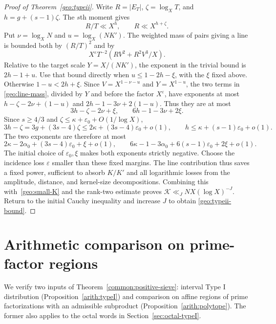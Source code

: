 \documentclass[11pt,a4paper]{article}
\theoremstyle{paperplain}
\numberwithin{equation}{section}
\begin{document}
\begin{proof}[Proof of Theorem~\ref{geo:typeii}]
Write $R=|E_T|$, $\zeta=\log_XT$, and $h=g+(s-1)\zeta$.
The $s$th moment gives
\[
 R/T\ll X^h,\qquad R\ll X^{h+\zeta}.
\]
Put $\nu=\log_XN$ and $u=\log_X(NK')$.
The weighted mass of pairs giving a line is bounded both by $(R/T)^2$ and by
\begin{equation}\label{geo:line-mass}
 X^\varepsilon T^{-2}\left(RV^2+R^2V^3/X\right).
\end{equation}
Relative to the target scale $Y=X/(NK')$, the exponent in the trivial bound is
$2h-1+u$.
Use that bound directly when $u\le1-2h-\xi$, with the $\xi$ fixed above.
Otherwise $1-u<2h+\xi$. Since $V=X^{1-\nu-u}$ and $Y=X^{1-u}$,
the two terms in \eqref{geo:line-mass}, divided by $Y$ and before the
factor $X^\varepsilon$, have exponents at most
$h-\zeta-2\nu+(1-u)$ and $2h-1-3\nu+2(1-u)$. Thus they are at most
\[
 3h-\zeta-2\nu+\xi,\qquad 6h-1-3\nu+2\xi.
\]
Since $s\ge4/3$ and
$\zeta\le\kappa+\varepsilon_0+O(1/\log X)$,
\[
 3h-\zeta=3g+(3s-4)\zeta
 \le2\kappa+(3s-4)\varepsilon_0+o(1),\qquad
 h\le\kappa+(s-1)\varepsilon_0+o(1).
\]
The two exponents are therefore at most
\begin{equation}\label{geo:line-powers}
 2\kappa-2\alpha_0+(3s-4)\varepsilon_0+\xi+o(1),\qquad
 6\kappa-1-3\alpha_0+6(s-1)\varepsilon_0+2\xi+o(1).
\end{equation}
The initial choice of $\varepsilon_0,\xi$ makes both exponents strictly
negative. Choose the incidence loss $\varepsilon$ smaller than these
fixed margins.
The line contribution thus saves a fixed power, sufficient to absorb
$K/K'$ and all logarithmic losses from the amplitude, distance, and kernel-size
decompositions.
Combining this with~\eqref{geo:small-K} and the rank-two estimate proves
$\mathcal K\ll_JNX(\log X)^{-J}$.
Return to the initial Cauchy inequality and increase $J$ to obtain
\eqref{geo:typeii-bound}.
\end{proof}


\section{Arithmetic comparison on prime-factor regions}\label{arith:section}

We verify two inputs of Theorem~\ref{common:positive-sieve}: interval
Type I distribution (Proposition~\ref{arith:typeI}) and comparison on
affine regions of prime factorizations with an admissible subproduct
(Proposition~\ref{arith:polytope}). The former also applies to the
octal words in Section~\ref{sec:octal-typeI}.
\end{document}
